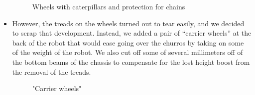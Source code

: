 \begin{itemize}
\begin{enumerate}
	\end{enumerate}
	\begin{figure}[H]
		\begin{minipage}[h]{\linewidth}
			\caption{Wheels with caterpillars and protection for chains}
		\end{minipage}
	\end{figure}
	\item However, the treads on the wheels turned out to tear easily, and we decided to scrap that development. Instead, we added a pair of “carrier wheels” at the back of the robot that would ease going over the churros by taking on some of the weight of the robot. We also cut off some of several millimeters off of the bottom beams of the chassis to compensate for the lost height boost from the removal of the treads.
	\begin{figure}[H]
		\begin{minipage}[h]{\linewidth}
			\caption{"Carrier wheels"}
		\end{minipage}
	\end{figure}
	
\end{itemize}
\fillpage
 
